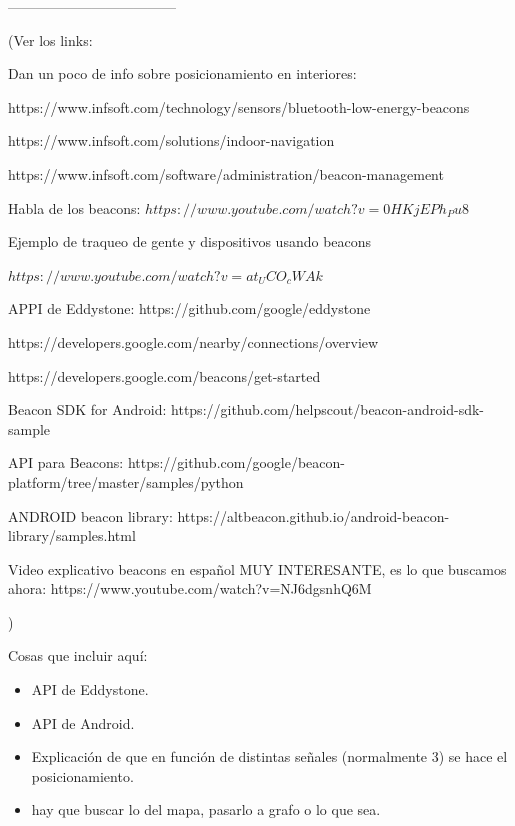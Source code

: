 ------------------------------------

(Ver los links: 

Dan un poco de info sobre posicionamiento en interiores:


https://www.infsoft.com/technology/sensors/bluetooth-low-energy-beacons

https://www.infsoft.com/solutions/indoor-navigation

https://www.infsoft.com/software/administration/beacon-management

Habla de los beacons:
$ https://www.youtube.com/watch?v=0HKjEPh_Pu8 $

Ejemplo de traqueo de gente y dispositivos usando beacons 

$ https://www.youtube.com/watch?v=at_UCO_cWAk $

APPI de Eddystone:
https://github.com/google/eddystone

https://developers.google.com/nearby/connections/overview

https://developers.google.com/beacons/get-started

Beacon SDK for Android: https://github.com/helpscout/beacon-android-sdk-sample

API para Beacons: https://github.com/google/beacon-platform/tree/master/samples/python

ANDROID beacon library: https://altbeacon.github.io/android-beacon-library/samples.html

Video explicativo beacons en español MUY INTERESANTE, es lo que buscamos ahora: https://www.youtube.com/watch?v=NJ6dgsnhQ6M

)

Cosas que incluir aquí:

\begin{itemize}
	\item API de Eddystone.
	\item API de Android.
	\item Explicación de que en función de distintas señales (normalmente 3) se hace el posicionamiento.
	\item hay que buscar lo del mapa, pasarlo a grafo o lo que sea.
\end{itemize}


 